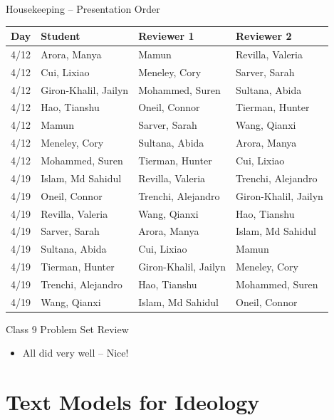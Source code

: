 \documentclass[
  ignorenonframetext,
  aspectratio=169]{beamer}
\begin{document}
\begin{frame}{Housekeeping -- Presentation Order}
\label{housekeeping-presentation-order}
\centering
\scriptsize
\renewcommand{\arraystretch}{1.2}
\begin{tabular}{llll}
\hline
\textbf{Day} & \textbf{Student} & \textbf{Reviewer 1} & \textbf{Reviewer 2} \\
\hline
4/12 & Arora, Manya & Mamun & Revilla, Valeria \\
4/12 & Cui, Lixiao & Meneley, Cory & Sarver, Sarah \\
4/12 & Giron-Khalil, Jailyn & Mohammed, Suren & Sultana, Abida \\
4/12 & Hao, Tianshu & Oneil, Connor & Tierman, Hunter \\
4/12 & Mamun & Sarver, Sarah & Wang, Qianxi \\
4/12 & Meneley, Cory & Sultana, Abida & Arora, Manya \\
4/12 & Mohammed, Suren & Tierman, Hunter & Cui, Lixiao \\
4/19 & Islam, Md Sahidul & Revilla, Valeria & Trenchi, Alejandro \\
4/19 & Oneil, Connor & Trenchi, Alejandro & Giron-Khalil, Jailyn \\
4/19 & Revilla, Valeria & Wang, Qianxi & Hao, Tianshu \\
4/19 & Sarver, Sarah & Arora, Manya & Islam, Md Sahidul \\
4/19 & Sultana, Abida & Cui, Lixiao & Mamun \\
4/19 & Tierman, Hunter & Giron-Khalil, Jailyn & Meneley, Cory \\
4/19 & Trenchi, Alejandro & Hao, Tianshu & Mohammed, Suren \\
4/19 & Wang, Qianxi & Islam, Md Sahidul & Oneil, Connor \\
\hline
\end{tabular}
\end{frame}

\begin{frame}{Class 9 Problem Set Review}
\label{class-9-problem-set-review}
\begin{itemize}
\item All did very well -- Nice! 
\end{itemize}
\end{frame}

\section{Text Models for Ideology}\label{text-models-for-ideology}
\end{document}
